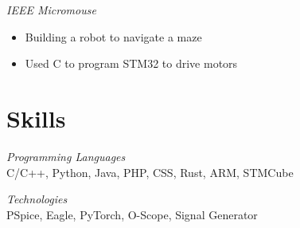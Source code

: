 \documentclass[line,margin]{res}
\begin{document}
\begin{resume}
    {\sl IEEE Micromouse}
    \begin{itemize}
        \item Building a robot to navigate a maze
        \item Used C to program STM32 to drive motors
    \end{itemize}

    \section{Skills}
    {\sl Programming Languages}\\
    C/C++, Python, Java, PHP, CSS, Rust, ARM, STMCube

    {\sl Technologies}\\
    PSpice, Eagle, PyTorch, O-Scope, Signal Generator
\end{resume}
\end{document}
